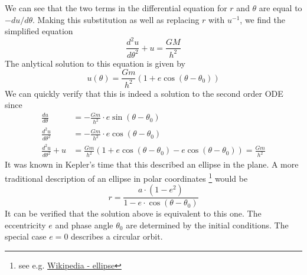 We can see that the two terms in the differential equation for $r$ and $\theta$ are equal to $-du / d\theta$.
Making this substitution as well as replacing $r$ with $u^{-1}$, we find the simplified equation
$$ \frac{d^2u}{d\theta^2} + u = \frac{GM}{h^2}$$
The anlytical solution to this equation is given by
$$u(\theta) = \frac{Gm}{h^2} \left(1 + e \cos(\theta - \theta_0) \right)$$
We can quickly verify that this is indeed a solution to the second order ODE since
\begin{align*}
\frac{du}{d\theta} &= -\frac{Gm}{h^2} \cdot e \sin(\theta - \theta_0) \\
\frac{d^2u}{d\theta^2} &= -\frac{Gm}{h^2} \cdot e \cos(\theta - \theta_0) \\
\frac{d^2u}{d\theta^2} + u &= \frac{Gm}{h^2} \left( 1 + e \cos(\theta-\theta_0) - e \cos(\theta - \theta_0) \right) = \frac{Gm}{h^2}
\end{align*}
It was known in Kepler's time that this described an ellipse in the plane.
A more traditional description of an ellipse in polar coordinates 
\footnote{see e.g. \href{https://en.wikipedia.org/wiki/Ellipse}{Wikipedia - ellipse}} would be
$$ r = \frac{a\cdot(1-e^2)}{1 - e \cdot \cos(\theta - \theta_0)}$$
It can be verified that the solution above is equivalent to this one.
The eccentricity $e$ and phase angle $\theta_0$ are determined by the initial conditions.
The special case $e=0$ describes a circular orbit.


